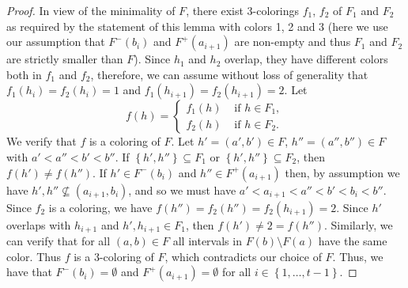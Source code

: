 \documentclass[12pt]{article}
\theoremstyle{definition}
\begin{document}
\begin{proof}
        In view of the minimality of
        $F$, there exist 3-colorings
        $f_1$, $f_2$ of $F_1$ and $F_2$ as required
        by the statement of this lemma
        with colors 1, 2 and 3 (here
        we use our assumption that
        $F^{-}\left(b_{i}\right)$ 
        and $F^{+}\left(a_{i+1}\right)$ 
        are non-empty and thus
        $F_{1}$ and $F_{2}$ are
        strictly smaller than $F$).
        Since $h_1$ and $h_2$ overlap,
        they have different colors
        both in $f_1$ and $f_2$, therefore,
        we can assume without loss of 
        generality that
        $f_1\left(h_{i}\right) = f_2\left(h_{i}\right) = 1$
        and $f_{1}\left(h_{i+1}\right) = 
        f_2\left(h_{i+1}\right) = 2$.
        Let
        \begin{equation*}
            f\left(h\right) = 
            \begin{cases}
                f_1\left(h\right) &\text{ if } h \in F_1, \\
                f_2\left(h\right) &\text{ if } h \in F_{2}.
            \end{cases}
        \end{equation*}
        We verify that $f$ 
        is a coloring of $F$. Let
        $h' = \left(a', b'\right) \in F$,
        $h'' = \left(a'', b''\right) \in F$
        with $a' < a'' < b' < b''$.
        If $\left\{h', h''\right\} \subseteq F_1$ 
        or $\left\{h', h''\right\} \subseteq F_2$,
        then $f\left(h'\right) \neq 
        f\left(h''\right)$.
        If $h' \in F^{-}\left(b_{i}\right)$ 
        and $h'' \in F^{+}\left(a_{i+1}\right)$
        then, by assumption
        we have
        $h', h'' \not \subseteq \left(a_{i+1}, b_{i}\right)$,
        and so we must have $a' < a_{i+1} < 
        a'' < b' < b_{i} < b''$. 
        Since $f_2$ is a coloring,
        we have $f\left(h''\right) =
        f_2\left(h''\right) =
        f_2\left(h_{i+1}\right) = 2$.
        Since $h'$ overlaps with $h_{i+1}$
        and $h', h_{i+1}
        \in F_1$, then $f\left(h'\right)
        \neq 2 = f\left(h''\right)$.
        Similarly, 
        we can verify
        that for all $\left(a, b\right) \in F$
        all intervals in $F\left(b\right)
        \setminus F\left(a\right)$
        have the same color.
        Thus
        $f$ is a 3-coloring of $F$,
        which contradicts our choice of $F$.
        Thus, we have that
        $F^{-}\left(b_{i}\right) = \emptyset$ and
        $F^{+}\left(a_{i+1}\right) = \emptyset$
        for all $i \in \left\{1, \ldots, t-1\right\}$.


\end{proof}
\end{document}
